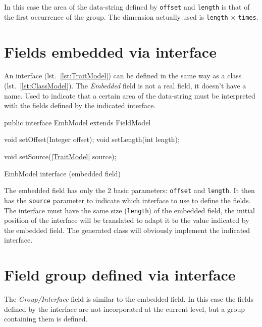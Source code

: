 In this case the area of the data-string defined by \verb!offset! and 
\verb!length! is that of the first occurrence of the group. 
The dimension actually used is \verb!length! $\times$ \verb!times!.

\section{Fields embedded via interface}
An interface (lst.~\ref{lst:TraitModel}) can be defined in the same way as a 
class (lst.~\ref{lst:ClassModel}). 
The \textsl{Embedded} field is not a real field, it doesn't have a name. 
Used to indicate that a certain area of the data-string must be interpreted with 
the fields defined by the indicated interface.

\begin{elisting}[!htb]
\begin{javacode}
public interface EmbModel extends FieldModel {
    void setOffset(Integer offset);
    void setLength(int length);
    
    void setSource(|\hyperref[lst:TraitModel]{TraitModel}| source);
}
\end{javacode}
\caption{EmbModel interface (embedded field)}
\label{lst:EmbModel}
\end{elisting}

The embedded field has only the 2 basic parameters: \verb!offset! and 
\verb!length!. 
It then has the \verb!source! parameter to indicate which interface to use to 
define the fields. The interface must have the same size (\verb!length!) of the 
embedded field, the initial position of the interface will be translated to 
adapt it to the value indicated by the embedded field. 
The generated class will obviously implement the indicated interface.

\section{Field group defined via interface} 
The \textsl{Group/Interface} field is similar to the embedded field. 
In this case the fields defined by the interface are not incorporated at the 
current level, but a group containing them is defined.

